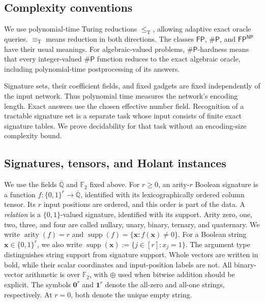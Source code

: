 \documentclass[11pt,letterpaper,onecolumn]{article}
\theoremstyle{plain}
\theoremstyle{definition}
\theoremstyle{remark}
\newcommand{\AlgNums}{\overline{\mathbb Q}}
\newcommand{\Ftwo}{\mathbb F_2}
\newcommand{\FP}{\mathsf{FP}}
\newcommand{\SharpP}{\#\mathsf P}
\newcommand{\supp}{\operatorname{supp}}
\newcommand{\arity}{\operatorname{arity}}
\newcommand{\one}{\mathbf 1}
\newcommand{\zero}{\mathbf 0}
\newcommand{\leT}{\leq_{\mathrm T}}
\newcommand{\equivT}{\equiv_{\mathrm T}}
\begin{document}
\subsection{Complexity conventions}
\label{subsec:complexity-conventions}

We use polynomial-time Turing reductions \(\leT\), allowing adaptive exact
oracle queries. \(\equivT\) means reduction in both directions.  The
classes \(\FP\), \(\SharpP\), and \(\FP^{\mathsf{NP}}\) have their usual
meanings.  For algebraic-valued problems, \(\SharpP\)-hardness means that
every integer-valued \(\SharpP\) function reduces to the exact algebraic
oracle, including polynomial-time postprocessing of its answers.

Signature sets, their coefficient fields, and fixed gadgets are fixed
independently of the input network.  Thus polynomial time measures the
network's encoding length. Exact answers use the chosen effective number
field.  Recognition of a tractable signature set is a separate task whose
input consists of finite exact signature tables.  We prove decidability
for that task without an encoding-size complexity bound.

\subsection{Signatures, tensors, and Holant instances}
\label{subsec:holant-definitions}

We use the fields \(\AlgNums\) and \(\Ftwo\) fixed above.  For \(r\ge0\), an
arity-\(r\) Boolean signature is a function
\(f:\{0,1\}^r\to\AlgNums\), identified with its lexicographically ordered
column tensor.  Its \(r\) input positions are ordered, and this order is
part of the data.  A \emph{relation} is a \(\{0,1\}\)-valued
signature, identified with its support.  Arity zero, one, two, three, and four are called
nullary, unary, binary, ternary, and quaternary.  We write \(\arity(f)=r\) and
\(\supp(f)=\{{\mathbf{x}}:f({\mathbf{x}})\ne0\}\).  For a Boolean
string \({\mathbf{x}}\in\{0,1\}^r\), we also write
\(\supp({\mathbf{x}}):=\{j\in[r]:x_j=1\}\). The argument type distinguishes string
support from signature support.
Whole vectors are written in bold, while their scalar coordinates and
input-position labels are not. All binary-vector arithmetic is over \(\Ftwo\), with \(\oplus\) used when
bitwise addition should be explicit.  The symbols \(\zero^r\) and
\(\one^r\) denote the all-zero and all-one strings, respectively. At \(r=0\),
both denote the unique empty string.
\end{document}
